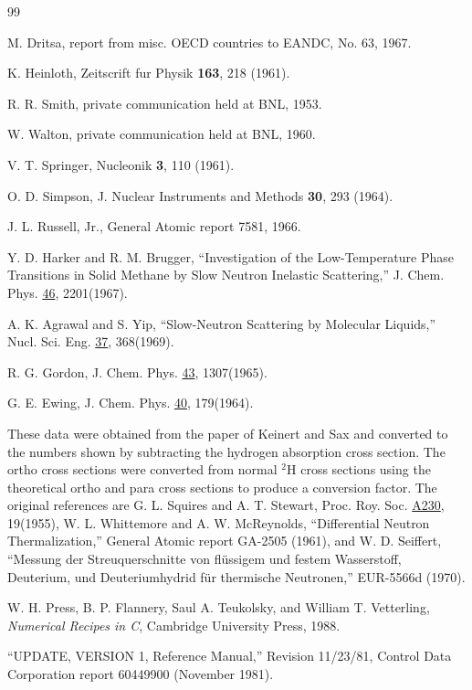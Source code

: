 \documentclass[11pt,twoside]{NJOYMan}
\begin{document}
\begin{thebibliography}{99}
\begin{singlespace}
 M. Dritsa, report from misc. OECD countries to EANDC,
  No. 63, 1967.

 K. Heinloth, Zeitscrift fur Physik {\bf 163},
  218 (1961).

 R. R. Smith, private communication held at BNL, 1953.

 W. Walton, private communication held at BNL, 1960.

 V. T. Springer, Nucleonik {\bf 3}, 110 (1961).

 O. D. Simpson, J. Nuclear Instruments and Methods
  {\bf 30}, 293 (1964).

 J. L. Russell, Jr., General Atomic report 7581, 1966.

 Y. D. Harker and R. M. Brugger,
  ``Investigation of the Low-Temperature Phase Transitions in Solid
  Methane by Slow Neutron Inelastic Scattering,'' J. Chem. Phys.
  \underline{46}, 2201(1967).

 A. K. Agrawal and S. Yip, ``Slow-Neutron
  Scattering by Molecular Liquids,'' Nucl. Sci. Eng. \underline{37},
  368(1969).

 R. G. Gordon, J. Chem. Phys. \underline{43}, 1307(1965).

 G. E. Ewing, J. Chem. Phys. \underline{40}, 179(1964).

 These data were obtained from the paper of Keinert
  and Sax\cite{Keinert} and converted to the numbers shown by
  subtracting the hydrogen absorption cross section.  The ortho
  cross sections were converted from normal $^{2}$H cross sections
  using the theoretical ortho and para cross sections to produce
  a conversion factor.  The original references are G. L. Squires
  and A. T. Stewart, Proc. Roy. Soc. \underline{A230}, 19(1955),
  W. L. Whittemore and A. W. McReynolds, ``Differential Neutron
  Thermalization,'' General Atomic report GA-2505 (1961), and
  W. D. Seiffert, ``Messung der Streuquerschnitte von fl\"{u}ssigem
  und festem Wasserstoff, Deuterium, und Deuteriumhydrid f\"{u}r
  thermische Neutronen,'' EUR-5566d (1970).

 W. H. Press, B. P. Flannery, Saul A. Teukolsky,
  and William T. Vetterling, {\it Numerical Recipes in C}, Cambridge
  University Press, 1988.

 ``UPDATE, VERSION 1, Reference Manual,''
  Revision 11/23/81, Control Data Corporation report 60449900
  (November 1981).


\end{singlespace}
\end{thebibliography}
\end{document}
